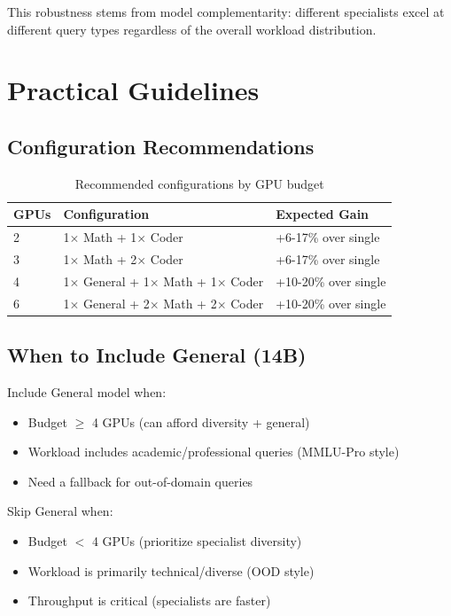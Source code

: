 \documentclass[11pt,a4paper]{article}
\begin{document}
This robustness stems from model complementarity: different specialists excel at different query types regardless of the overall workload distribution.

\section{Practical Guidelines}

\subsection{Configuration Recommendations}

\begin{table}[h]
\centering
\caption{Recommended configurations by GPU budget}
\label{tab:recommendations}
\begin{tabular}{lll}
\toprule
\textbf{GPUs} & \textbf{Configuration} & \textbf{Expected Gain} \\
\midrule
2 & 1$\times$ Math + 1$\times$ Coder & +6-17\% over single \\
3 & 1$\times$ Math + 2$\times$ Coder & +6-17\% over single \\
4 & 1$\times$ General + 1$\times$ Math + 1$\times$ Coder & +10-20\% over single \\
6 & 1$\times$ General + 2$\times$ Math + 2$\times$ Coder & +10-20\% over single \\
\bottomrule
\end{tabular}
\end{table}

\subsection{When to Include General (14B)}

Include General model when:
\begin{itemize}
    \item Budget $\geq$ 4 GPUs (can afford diversity + general)
    \item Workload includes academic/professional queries (MMLU-Pro style)
    \item Need a fallback for out-of-domain queries
\end{itemize}

Skip General when:
\begin{itemize}
    \item Budget $<$ 4 GPUs (prioritize specialist diversity)
    \item Workload is primarily technical/diverse (OOD style)
    \item Throughput is critical (specialists are faster)
\end{itemize}
\end{document}
